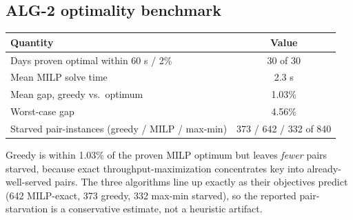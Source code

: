 \subsection{ALG-2 optimality benchmark}
\begin{center}\small
\begin{tabular}{@{}lc@{}}\toprule Quantity & Value \\ \midrule
Days proven optimal within 60 s / 2\% & 30 of 30 \\
Mean MILP solve time & 2.3 s \\
Mean gap, greedy vs.\ optimum & 1.03\% \\
Worst-case gap & 4.56\% \\
Starved pair-instances (greedy / MILP / max-min) & 373 / 642 / 332 of 840 \\ \bottomrule
\end{tabular}\end{center}
Greedy is within 1.03\% of the proven MILP optimum but leaves \emph{fewer} pairs starved, because exact throughput-maximization concentrates key into already-well-served pairs. The three algorithms line up exactly as their objectives predict (642 MILP-exact, 373 greedy, 332 max-min starved), so the reported pair-starvation is a conservative estimate, not a heuristic artifact.

